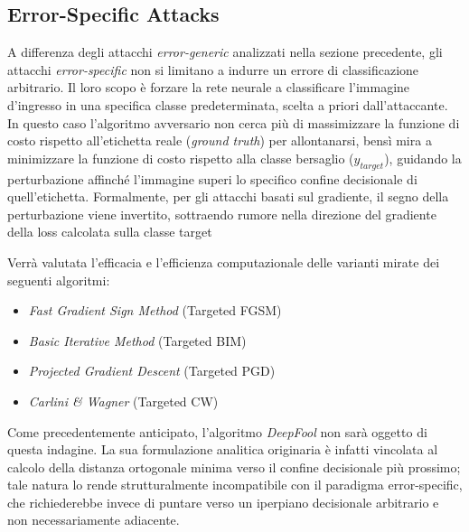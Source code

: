 \documentclass[a4paper, 12pt]{article}
\begin{document}
\subsection{Error-Specific Attacks}
A differenza degli attacchi \textit{error-generic} analizzati nella sezione precedente, gli attacchi \textit{error-specific} non si limitano a indurre un errore di classificazione arbitrario. Il loro scopo è forzare la rete neurale a classificare l'immagine d'ingresso in una specifica classe predeterminata, scelta a priori dall'attaccante.
In questo caso l'algoritmo avversario non cerca più di massimizzare la funzione di costo rispetto all'etichetta reale (\textit{ground truth}) per allontanarsi, bensì mira a minimizzare la funzione di costo rispetto alla classe bersaglio ($y_{target}$), guidando la perturbazione affinché l'immagine superi lo specifico confine decisionale di quell'etichetta. 
Formalmente, per gli attacchi basati sul gradiente, il segno della perturbazione viene invertito, sottraendo rumore nella direzione del gradiente della loss calcolata sulla classe target

Verrà valutata l'efficacia e l'efficienza computazionale delle varianti mirate dei seguenti algoritmi:
\begin{itemize}
    \item \textit{Fast Gradient Sign Method} (Targeted FGSM)
    \item \textit{Basic Iterative Method} (Targeted BIM)
    \item \textit{Projected Gradient Descent} (Targeted PGD)
    \item \textit{Carlini \& Wagner} (Targeted CW)
\end{itemize}

Come precedentemente anticipato, l'algoritmo \textit{DeepFool} non sarà oggetto di questa indagine. La sua formulazione analitica originaria è infatti vincolata al calcolo della distanza ortogonale minima verso il confine decisionale più prossimo; tale natura lo rende strutturalmente incompatibile con il paradigma error-specific, che richiederebbe invece di puntare verso un iperpiano decisionale arbitrario e non necessariamente adiacente.
\end{document}

